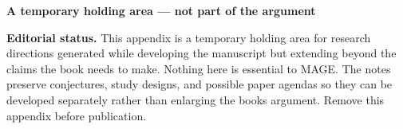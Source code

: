 

\textbf{A temporary holding area --- not part of the argument}

\textbf{Editorial status.} This appendix is a temporary holding area for research directions generated while developing the manuscript but extending beyond the claims the book needs to make. Nothing here is essential to MAGE. The notes preserve conjectures, study designs, and possible paper agendas so they can be developed separately rather than enlarging the book\textquotesingle s argument. Remove this appendix before publication.
